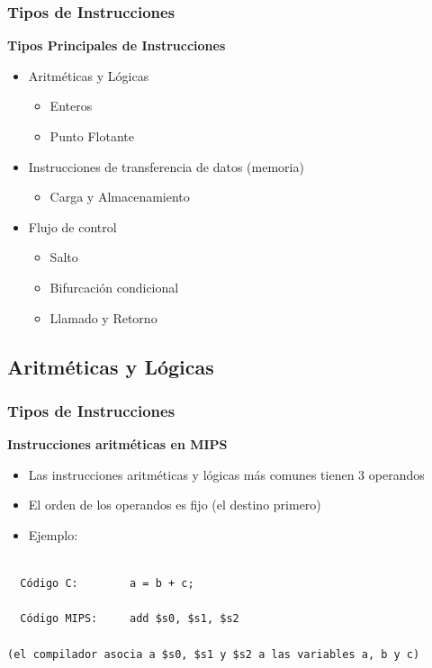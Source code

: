 \documentclass[aspectratio=169,compress]{beamer}
\begin{document}
\begin{footnotesize}
\begin{frame}
\frametitle{Tipos de Instrucciones}
\begin{center}\textbf{Tipos Principales de Instrucciones}\end{center}
\begin{itemize}
\item Aritméticas y Lógicas
\begin{itemize}
\item Enteros
\item Punto Flotante
\end{itemize}
\item Instrucciones de transferencia de datos (memoria)
\begin{itemize}
\item Carga y Almacenamiento
\end{itemize}
\item Flujo de control
\begin{itemize}
\item Salto
\item Bifurcación condicional
\item Llamado y Retorno
\end{itemize}
\end{itemize}
\end{frame}


\subsection{Aritméticas y Lógicas}

\begin{frame}[fragile]
\frametitle{Tipos de Instrucciones}
\begin{center}\textbf{Instrucciones aritméticas en MIPS}\end{center}
\begin{itemize}
\item Las instrucciones aritméticas y lógicas más comunes tienen 3 operandos
\item El orden de los operandos es fijo (el destino primero)
\item Ejemplo:
\end{itemize}

\begin{verbatim}

  Código C:        a = b + c;

  Código MIPS:     add $s0, $s1, $s2

(el compilador asocia a $s0, $s1 y $s2 a las variables a, b y c)


\end{verbatim}
\end{frame}
\end{footnotesize}
\end{document}
